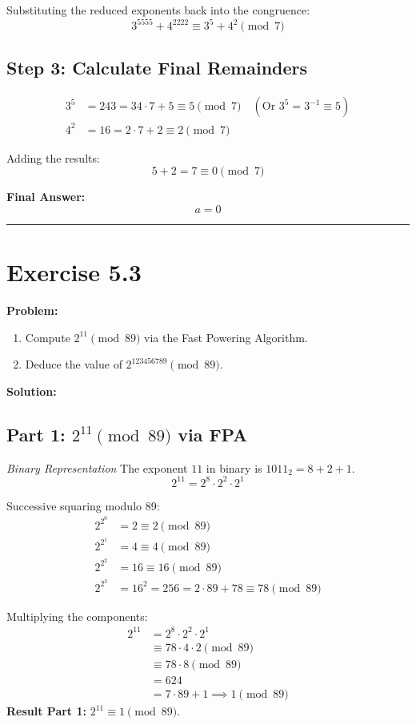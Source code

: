 Substituting the reduced exponents back into the congruence:
$$ 3^{5555} + 4^{2222} \equiv 3^5 + 4^2 \pmod{7} $$

\subsection*{Step 3: Calculate Final Remainders}
\begin{align*}
    3^5 &= 243 = 34 \cdot 7 + 5 \equiv 5 \pmod{7} \quad (\text{Or } 3^5 = 3^{-1} \equiv 5) \\
    4^2 &= 16 = 2 \cdot 7 + 2 \equiv 2 \pmod{7}
\end{align*}

Adding the results:
$$ 5 + 2 = 7 \equiv 0 \pmod{7} $$

\textbf{Final Answer:}
$$ a = 0 $$

\hrule
\vspace{1cm}
\newpage
\section*{Exercise 5.3}
\textbf{Problem:}
\begin{enumerate}
    \item Compute $2^{11} \pmod{89}$ via the Fast Powering Algorithm.
    \item Deduce the value of $2^{123456789} \pmod{89}$.
\end{enumerate}

\textbf{Solution:}

\subsection*{Part 1: $2^{11} \pmod{89}$ via FPA}
\textit{Binary Representation}
The exponent $11$ in binary is $1011_2 = 8 + 2 + 1$.
$$ 2^{11} = 2^8 \cdot 2^2 \cdot 2^1 $$

Successive squaring modulo 89:
\begin{align*}
    2^{2^0} &= 2 \equiv 2 \pmod{89} \\
    2^{2^1} &= 4 \equiv 4 \pmod{89} \\
    2^{2^2} &= 16 \equiv 16 \pmod{89} \\
    2^{2^3} &= 16^2 = 256 = 2 \cdot 89 + 78 \equiv 78 \pmod{89}
\end{align*}

Multiplying the components:
\begin{align*}
    2^{11} &= 2^8 \cdot 2^2 \cdot 2^1 \\
           &\equiv 78 \cdot 4 \cdot 2 \pmod{89} \\
           &\equiv 78 \cdot 8 \pmod{89} \\
           &= 624 \\
           &= 7 \cdot 89 + 1 \implies 1 \pmod{89}
\end{align*}
\textbf{Result Part 1:} $2^{11} \equiv 1 \pmod{89}$.


